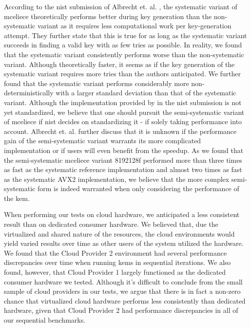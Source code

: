 According to the \gls{nist} submission of Albrecht et. al. \cite{mceliece2020}, the systematic variant of \gls{mceliece} theoretically performs better during key generation than the non-systematic variant as it requires less computational work per key-generation attempt. They further state that this is true for as long as the systematic variant succeeds in finding a valid key with as few tries as possible. In reality, we found that the systematic variant consistently performs worse than the non-systematic variant. Although theoretically faster, it seems as if the key generation of the systematic variant requires more tries than the authors anticipated. We further found that the systematic variant performs considerably more non-deterministically with a larger standard deviation than that of the systematic variant. Although the implementation provided by in the \gls{nist} submission is not yet standardized, we believe that one should pursuit the semi-systematic variant of \gls{mceliece} if \gls{nist} decides on standardizing it - if solely taking performance into account. Albrecht et. al. further discuss that it is unknown if the performance gain of the semi-systematic variant warrants its more complicated implementation or if users will even benefit from the speedup. As we found that the semi-systematic \gls{mceliece} variant 8192128f performed more than three times as fast as the systematic reference implementation and almost two times as fast as the systematic AVX2 implementation, we believe that the more complex semi-systematic form is indeed warranted when only considering the performance of the \gls{kem}.

When performing our tests on cloud hardware, we anticipated a less consistent result than on dedicated consumer hardware. We believed that, due the virtualized and shared nature of the resources, the cloud environments would yield varied results over time as other users of the system utilized the hardware. We found that the Cloud Provider 2 environment had several performance discrepancies over time when running \glspl{kem} in sequential iterations. We also found, however, that Cloud Provider 1 largely functioned as the dedicated consumer hardware we tested. Although it's difficult to conclude from the small sample of cloud providers in our tests, we argue that there is in fact a non-zero chance that virtualized cloud hardware performs less consistently than dedicated hardware, given that Cloud Provider 2 had performance discrepancies in all of our sequential benchmarks. 

